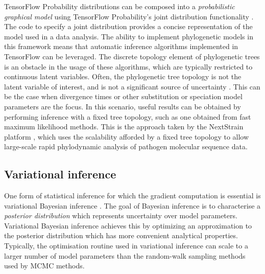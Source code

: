 TensorFlow Probability distributions can be composed into a \textit{probabilistic graphical model} using TensorFlow Probability's joint distribution functionality \cite{piponi2020joint}. The code to specify a joint distribution provides a concise representation of the model used in a data analysis. The ability to implement phylogenetic models in this framework means that automatic inference algorithms implemented in TensorFlow can be leveraged. The discrete topology element of phylogenetic trees is an obstacle in the usage of these algorithms, which are typically restricted to continuous latent variables. Often, the phylogenetic tree topology is not the latent variable of interest, and is not a significant source of uncertainty \cite{yang2000codon}. This can be the case when divergence times or other substitution or speciation model parameters are the focus. In this scenario, useful results can be obtained by performing inference with a fixed tree topology, such as one obtained from fast maximum likelihood methods. This is the approach taken by the NextStrain platform \cite{hadfield2018nextstrain}, which uses the scalability afforded by a fixed tree topology to allow large-scale rapid phylodynamic analysis of pathogen molecular sequence data.

\subsection{Variational inference}

One form of statistical inference for which the gradient computation is essential is variational Bayesian inference \cite{jordan1999introduction}. The goal of Bayesian inference is to characterise a \textit{posterior distribution} which represents uncertainty over model parameters. Variational Bayesian inference achieves this by optimizing an approximation to the posterior distribution which has more convenient analytical properties. Typically, the optimisation routine used in variational inference can scale to a larger number of model parameters than the random-walk sampling methods used by MCMC methods.

